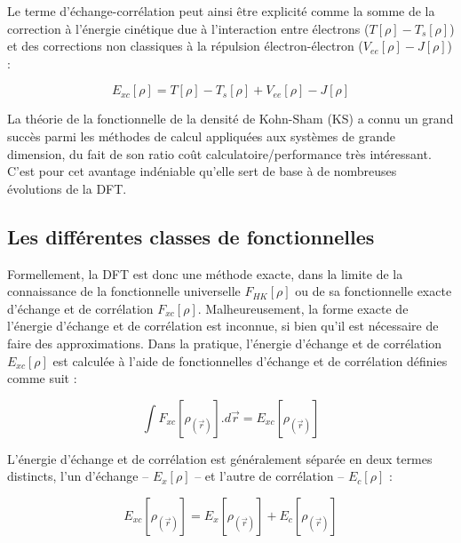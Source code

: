 \documentclass[12pt,a4paper]{book}
\begin{document}
	Le terme d'échange-corrélation peut ainsi être explicité comme la somme de la correction à l'énergie cinétique due à l'interaction entre électrons ($T[\rho] - T_{s}[\rho]$) et des corrections non classiques à la répulsion électron-électron ($V_{ee}[\rho] - J[\rho]$) :
	
	\begin{equation}
	E_{xc}[\rho] = T[\rho] - T_{s}[\rho] + V_{ee}[\rho] - J[\rho]
	\end{equation}
	
	La théorie de la fonctionnelle de la densité de Kohn-Sham (KS) a connu un grand succès parmi les méthodes de calcul appliquées aux systèmes de grande dimension, du fait de son ratio coût calculatoire/performance très intéressant. C'est pour cet avantage indéniable qu'elle sert de base à de nombreuses évolutions de la DFT.
	
	\subsection{Les différentes classes de fonctionnelles}
	
	Formellement, la DFT est donc une méthode exacte, dans la limite de la connaissance de la fonctionnelle universelle $F_{HK}[\rho]$ ou de sa fonctionnelle exacte d’échange et de corrélation $F_{xc}[\rho]$. Malheureusement, la forme exacte de l’énergie d’échange et de corrélation est inconnue, si bien qu’il est nécessaire de faire des approximations. Dans la pratique, l’énergie d’échange et de corrélation $E_{xc}[\rho]$ est calculée à l’aide de fonctionnelles d’échange et de corrélation définies comme suit :
	
	\begin{equation}
	\int F_{xc}[\rho_{(\vec{r})}].d\vec{r} = E_{xc}[\rho_{(\vec{r})}]
	\end{equation}
	
	L’énergie d’échange et de corrélation est généralement séparée en deux termes distincts, l’un d’échange -- $E_{x}[\rho]$ -- et l’autre de corrélation -- $E_{c}[\rho]$ :
	
	\begin{equation}
	E_{xc}[\rho_{(\vec{r})}] = E_{x}[\rho_{(\vec{r})}] + E_{c}[\rho_{(\vec{r})}]
	\end{equation}
	
\end{document}

